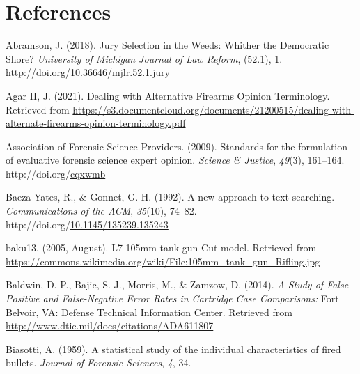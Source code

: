 \documentclass[print]{nuthesis}
\newlength{\cslhangindent}
\newenvironment{CSLReferences}[2]%
{\setlength{\parindent}{0pt}%
\everypar{\setlength{\hangindent}{\cslhangindent}}\ignorespaces}%
{\par}
\begin{document}
\backmatter

\hypertarget{references}{%
\chapter*{References}\label{references}}

\noindent

\setlength{\parindent}{-0.20in}
\setlength{\leftskip}{0.20in}
\setlength{\parskip}{8pt}

\hypertarget{refs}{}
\begin{CSLReferences}{1}{0}
\leavevmode{}%
Abramson, J. (2018). Jury {Selection} in the {Weeds}: {Whither} the {Democratic} {Shore}? \emph{University of Michigan Journal of Law Reform}, (52.1), 1. http://doi.org/\href{https://doi.org/10.36646/mjlr.52.1.jury}{10.36646/mjlr.52.1.jury}

\leavevmode{}%
Agar II, J. (2021). Dealing with {Alternative} {Firearms} {Opinion} {Terminology}. Retrieved from \url{https://s3.documentcloud.org/documents/21200515/dealing-with-alternate-firearms-opinion-terminology.pdf}

\leavevmode{}%
Association of Forensic Science Providers. (2009). Standards for the formulation of evaluative forensic science expert opinion. \emph{Science \& Justice}, \emph{49}(3), 161--164. http://doi.org/\href{https://doi.org/cqxwmb}{cqxwmb}

\leavevmode{}%
Baeza-Yates, R., \& Gonnet, G. H. (1992). A new approach to text searching. \emph{Communications of the ACM}, \emph{35}(10), 74--82. http://doi.org/\href{https://doi.org/10.1145/135239.135243}{10.1145/135239.135243}

\leavevmode{}%
baku13. (2005, August). L7 105mm tank gun {Cut} model. Retrieved from \url{https://commons.wikimedia.org/wiki/File:105mm_tank_gun_Rifling.jpg}

\leavevmode{}%
Baldwin, D. P., Bajic, S. J., Morris, M., \& Zamzow, D. (2014). \emph{A {Study} of {False}-{Positive} and {False}-{Negative} {Error} {Rates} in {Cartridge} {Case} {Comparisons}:} Fort Belvoir, VA: Defense Technical Information Center. Retrieved from \url{http://www.dtic.mil/docs/citations/ADA611807}

\leavevmode{}%
Biasotti, A. (1959). A statistical study of the individual characteristics of fired bullets. \emph{Journal of Forensic Sciences}, \emph{4}, 34.


\end{CSLReferences}
\end{document}
